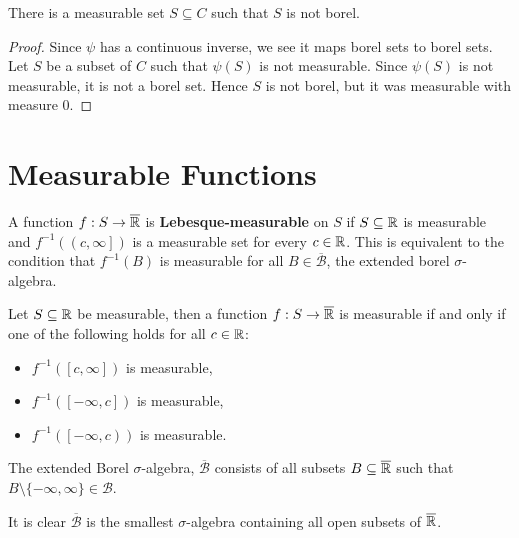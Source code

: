\begin{corollary}
	There is a measurable set \(S \subseteq C\) such that \(S\) is not borel.
\end{corollary}
\begin{proof}
	Since \(\psi\) has a continuous inverse, we see it maps borel sets to borel sets. Let \(S\) be a subset of \(C\) such that \(\psi\left( S \right) \) is not measurable. Since \(\psi\left( S \right) \) is not measurable, it is not a borel set. Hence \(S\) is not borel, but it was measurable with measure \(0\).
\end{proof}
\section{Measurable Functions}
\begin{definition}
	A function \(f: S \to \overline{\mathbb{R}}\) is \textbf{Lebesque-measurable} on \(S\) if \(S \subseteq \mathbb{R}\) is measurable and \(f^{-1}\left( \left( c, \infty \right]  \right) \) is a measurable set for every \(c \in \mathbb{R}\). This is equivalent to the condition that \(f^{-1}\left( B \right) \) is measurable for all \(B \in \overline{\mathscr{B}}\), the extended borel \(\sigma\)-algebra.
\end{definition}
\begin{proposition}
	Let \(S \subseteq \mathbb{R}\) be measurable, then a function \(f: S \to \overline{\mathbb{R}}\) is measurable if and only if one of the following holds for all \(c \in \mathbb{R}\):
	\begin{itemize}
		\item \(f^{-1} \left( \left[ c, \infty \right]  \right) \) is measurable,
		\item \(f^{-1} \left( \left[ -\infty, c \right]  \right) \) is measurable,
		\item \(f^{-1}\left( \left[ -\infty, c \right) \right) \) is measurable.
	\end{itemize}
\end{proposition}
\begin{definition}
	The extended Borel \(\sigma\)-algebra, \(\overline{\mathscr{B}}\) consists of all subsets \(B \subseteq \overline{\mathbb{R}}\) such that \(B \setminus \{-\infty, \infty\}  \in \mathscr{B}\).
\end{definition}
\begin{remark}
	It is clear \(\overline{\mathscr{B}}\) is the smallest \(\sigma\)-algebra containing all open subsets of \(\overline{\mathbb{R}}\).
\end{remark}
